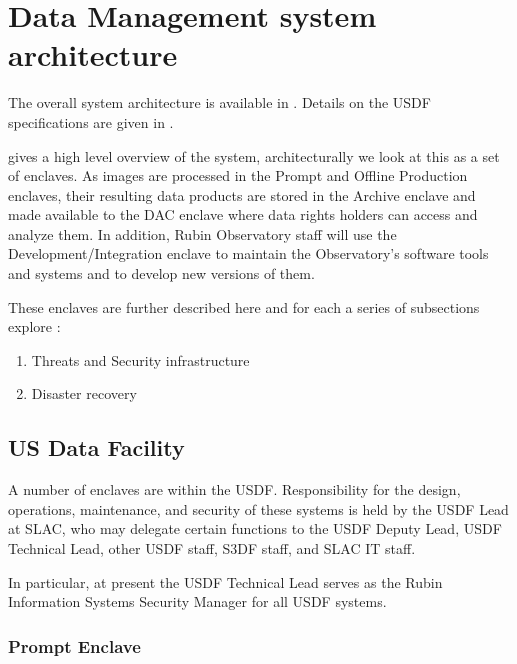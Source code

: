 

\section{Data Management system architecture} \label{sec:dparc}
The overall system architecture is available in .
Details on the \gls{USDF} specifications are given in .

 gives a high level overview of the system, architecturally we look
at this as a set of enclaves.
As images are processed in the Prompt and Offline Production enclaves, their resulting data products are stored in the \gls{Archive} enclave and made available to the \gls{DAC} enclave where data rights holders can access and analyze them.
In addition, Rubin Observatory staff will use the Development/Integration enclave to maintain the Observatory's \gls{software} tools and systems and to develop new versions of them.

These enclaves are further described here and for each a series of subsections explore :


\begin{enumerate}
\item Threats and Security infrastructure
\item Disaster recovery
\end{enumerate}

\subsection{US Data Facility}\label{sec:usdf}

A number of enclaves are within the \gls{USDF}.
Responsibility for the design, operations, maintenance, and security of these systems is held by the \gls{USDF} Lead at SLAC, who may delegate certain functions to the \gls{USDF} Deputy Lead, \gls{USDF} Technical Lead, other \gls{USDF} staff, S3DF staff, and SLAC IT staff.

In particular, at present the USDF Technical Lead serves as the Rubin Information Systems Security Manager for all USDF systems.

\subsubsection{Prompt \gls{Enclave}} \label{sec:promptenc}

